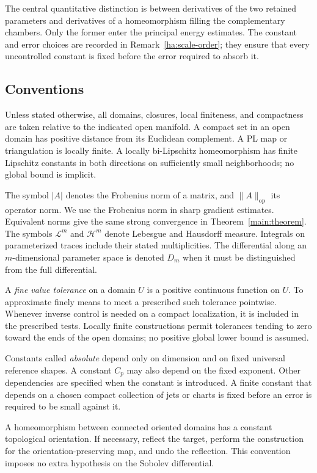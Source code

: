 \documentclass[11pt]{article}
\numberwithin{equation}{section}
\theoremstyle{definition}
\theoremstyle{remark}
\newcommand{\cH}{\mathcal H}
\newcommand{\cL}{\mathcal L}
\newcommand{\op}{\mathrm{op}}
\begin{document}
The central quantitative distinction is between derivatives of the
two retained parameters and derivatives of a homeomorphism filling
the complementary chambers.  Only the former enter the principal
energy estimates.  The constant and error choices are recorded in
Remark~\ref{ha:scale-order}; they ensure that every uncontrolled
constant is fixed before the error required to absorb it.

\subsection{Conventions}

Unless stated otherwise, all domains, closures, local finiteness, and compactness are taken relative to the indicated open manifold. A compact set in an open domain has positive distance from its Euclidean complement. A PL map or triangulation is locally finite. A locally bi-Lipschitz homeomorphism has finite Lipschitz constants in both directions on sufficiently small neighborhoods; no global bound is implicit.

The symbol $|A|$ denotes the Frobenius norm of a matrix, and $\|A\|_{\op}$ its operator norm. We use the Frobenius norm in sharp gradient estimates. Equivalent norms give the same strong convergence in Theorem~\ref{main:theorem}. The symbols $\cL^m$ and $\cH^m$ denote Lebesgue and Hausdorff measure. Integrals on parameterized traces include their stated multiplicities. The differential along an $m$-dimensional parameter space is denoted $D_m$ when it must be distinguished from the full differential.

A \emph{fine value tolerance} on a domain $U$ is a positive continuous function on $U$. To approximate finely means to meet a prescribed such tolerance pointwise. Whenever inverse control is needed on a compact localization, it is included in the prescribed tests. Locally finite constructions permit tolerances tending to zero toward the ends of the open domains; no positive global lower bound is assumed.

Constants called \emph{absolute} depend only on dimension and on fixed universal reference shapes. A constant $C_p$ may also depend on the fixed exponent. Other dependencies are specified when the constant is introduced. A finite constant that depends on a chosen compact collection of jets or charts is fixed before an error is required to be small against it.

A homeomorphism between connected oriented domains has a constant topological orientation. If necessary, reflect the target, perform the construction for the orientation-preserving map, and undo the reflection. This convention imposes no extra hypothesis on the Sobolev differential.
\end{document}
